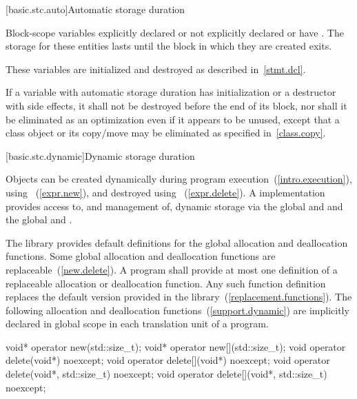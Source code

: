 [basic.stc.auto]{Automatic storage duration}

\pnum
{}%
%
%
Block-scope variables explicitly declared  or
not explicitly declared  or  have
. The storage
for these entities lasts until the block in which they are created exits.

\pnum
\enternote 
These variables are initialized and destroyed as described in~\ref{stmt.dcl}.
\exitnote 

\pnum
If a variable with automatic storage duration has initialization or a destructor with side
effects, it shall not be destroyed before the end of its block, nor
shall it be eliminated as an optimization even if it appears to be
unused, except that a class object or its copy/move may be eliminated as
specified in~\ref{class.copy}.

[basic.stc.dynamic]{Dynamic storage duration}%

\pnum
Objects can be created dynamically during program
execution~(\ref{intro.execution}), using
%
~(\ref{expr.new}), and destroyed using
%
~(\ref{expr.delete}). A \Cpp implementation
provides access to, and management of, dynamic storage via the global
  and  and the global   and .

\pnum
The library provides default definitions for the global allocation and
deallocation functions. Some global allocation and deallocation
functions are replaceable~(\ref{new.delete}). A \Cpp program shall
provide at most one definition of a replaceable allocation or
deallocation function. Any such function definition replaces the default
version provided in the library~(\ref{replacement.functions}). The
following allocation and deallocation functions~(\ref{support.dynamic})
are implicitly declared in global scope in each translation unit of a
program.

\begin{codeblock}
void* operator new(std::size_t);
void* operator new[](std::size_t);
void operator delete(void*) noexcept;
void operator delete[](void*) noexcept;
void operator delete(void*, std::size_t) noexcept;
void operator delete[](void*, std::size_t) noexcept;
\end{codeblock}

